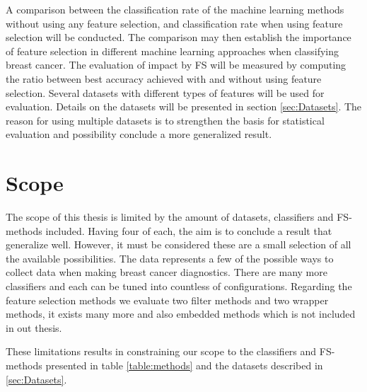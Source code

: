 A comparison between the classification rate of the machine learning methods without using any feature selection, and classification rate when using feature selection will be conducted. The comparison may then establish the importance of feature selection in different machine learning approaches when classifying breast cancer. The evaluation of impact by FS will be measured by computing the ratio between best accuracy achieved with and without using feature selection. Several datasets with different types of features will be used for evaluation. Details on the datasets will be presented in section \ref{sec:Datasets}. The reason for using multiple datasets is to strengthen the basis for statistical evaluation and possibility conclude a more generalized result.


\section{Scope}

The scope of this thesis is limited by the amount of datasets, classifiers and FS-methods included. Having four of each, the aim is to conclude a result that generalize well. However, it must be considered these are a small selection of all the available possibilities. The data represents a few of the possible ways to collect data when making breast cancer diagnostics. There are many more classifiers and each can be tuned into countless of configurations. Regarding the feature selection methods we evaluate two filter methods and two wrapper methods, it exists many more and also embedded methods which is not included in out thesis.

These limitations results in constraining our scope to the classifiers and FS-methods presented in table \ref{table:methods} and the datasets described in \ref{sec:Datasets}.
